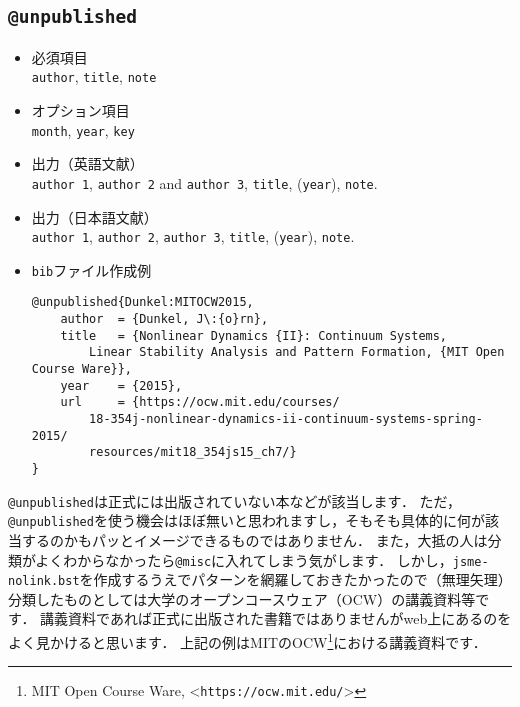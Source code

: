 \documentclass[a4paper,fleqn,uplatex,dvipdfmx]{jsarticle}
\makeatletter
\newcommand{\jsmefile}{\texttt{jsme-nolink.bst}}
\newcommand{\ttmisc}{\texttt{@misc}}
\newcommand{\ttunpublished}{\texttt{@unpublished}}
\makeatother
\begin{document}
\subsection{\ttunpublished}
\label{ssec:unpublished}
\begin{screen}
    \begin{itemize}
        \item 必須項目 \\
        \verb|author|, \verb|title|, \verb|note|
        \item オプション項目 \\
        \verb|month|, \verb|year|, \verb|key|
        \item 出力（英語文献） \\
            \colorbox[gray]{0.8}{\texttt{author 1}}, \colorbox[gray]{0.8}{\texttt{author 2}} and \colorbox[gray]{0.8}{\texttt{author 3}}, \colorbox[gray]{0.8}{\texttt{title}}, (\colorbox[gray]{0.8}{\texttt{year}}), \colorbox[gray]{0.8}{\texttt{note}}.
        \item 出力（日本語文献） \\
            \colorbox[gray]{0.8}{\texttt{author 1}}, \colorbox[gray]{0.8}{\texttt{author 2}}, \colorbox[gray]{0.8}{\texttt{author 3}}, \colorbox[gray]{0.8}{\texttt{title}}, (\colorbox[gray]{0.8}{\texttt{year}}), \colorbox[gray]{0.8}{\texttt{note}}.
        \item \verb|bib|ファイル作成例 \vspace{-3mm}
\begin{verbatim}
@unpublished{Dunkel:MITOCW2015,
    author  = {Dunkel, J\:{o}rn},
    title   = {Nonlinear Dynamics {II}: Continuum Systems, 
        Linear Stability Analysis and Pattern Formation, {MIT Open Course Ware}},
    year    = {2015},
    url     = {https://ocw.mit.edu/courses/
        18-354j-nonlinear-dynamics-ii-continuum-systems-spring-2015/
        resources/mit18_354js15_ch7/}
}
\end{verbatim}
    \end{itemize}
\end{screen}

\ttunpublished は正式には出版されていない本などが該当します．
ただ，\ttunpublished を使う機会はほぼ無いと思われますし，そもそも具体的に何が該当するのかもパッとイメージできるものではありません．
また，大抵の人は分類がよくわからなかったら\ttmisc に入れてしまう気がします．
しかし，\jsmefile を作成するうえでパターンを網羅しておきたかったので（無理矢理）分類したものとしては大学のオープンコースウェア（OCW）の講義資料等です．
講義資料であれば正式に出版された書籍ではありませんがweb上にあるのをよく見かけると思います．
上記の例はMITのOCW\footnote{MIT Open Course Ware, \textless\verb|https://ocw.mit.edu/|\textgreater}における講義資料です．
\end{document}
